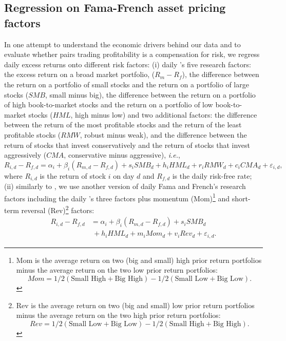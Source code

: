 \documentclass[a4paper]{article}
\begin{document}
	\medskip
	
	\subsection{Regression on Fama-French asset pricing factors}
	
	In one attempt to understand the economic drivers behind our data and to evaluate whether pairs trading profitability is a compensation for risk, we regress daily excess returns onto different risk factors: (i) daily \citet*{ff15}'s five research factors: the excess return on a broad market portfolio, ($R_{m} - R_{f}$), the difference between the return on a portfolio of small stocks and the return on a portfolio of large stocks ($SMB$, small minus big), the difference between the return on a portfolio of high book-to-market stocks and the return on a portfolio of low book-to-market stocks ($HML$, high minus low) and two additional factors: the difference between the return of the most profitable stocks and the return of the least profitable stocks ($RMW$, robust minus weak), and the difference between the return of stocks that invest conservatively and the return of stocks that invest aggressively ($CMA$, conservative minus aggressive),  \emph{i.e.},
	\begin{equation}
	R_{i,d}-R_{f,d}=\alpha _{i}+\beta _{i}\left( R_{m,d}-R_{f,d}\right)
	+s_{i}SMB_{d}+h_{i}HML_{d}+r_{i}RMW_{d}+c_{i}CMA_{d}+\varepsilon _{i,d},
	\label{eq:eq101}
	\end{equation}
	where $R_{i,d}$ is the return of stock $i$ on day $d$ and $R_{f,d}$ is the daily risk-free rate; (ii) similarly to \citet*{ggr06}, we use another version of daily Fama and French's research factors including the daily \citet*{ff93}'s three factors plus momentum (Mom)\footnote{Mom is the average return on two (big and small) high prior return portfolios minus the average return on the two low prior return portfolios:
		\begin{equation*}
		Mom = 1/2 (\text{Small High} + \text{Big High}) - 1/2(\text{Small Low} + \text{Big Low}).
		\end{equation*}}
	and short-term reversal (Rev)\footnote{Rev is the average return on two (big and small) low prior return portfolios minus the average return on the two high prior return portfolios:
		\begin{equation*}
		Rev = 1/2(\text{Small Low} + \text{Big Low})- 1/2(\text{Small High} + \text{Big High}).
		\end{equation*}}
	factors:
	\begin{equation}
	\begin{aligned}
	R_{i,d}-R_{f,d}&=\alpha _{i}+\beta _{i}\left( R_{m,d}-R_{f,d}\right)+s_{i}SMB_{d}\\
	&~+h_{i}HML_{d}+m_{i}Mom_{d}+v_{i}Rev_{d}+\varepsilon _{i,d}.
	\end{aligned}
	\label{eq:eq104}
	\end{equation}
	
\end{document}
